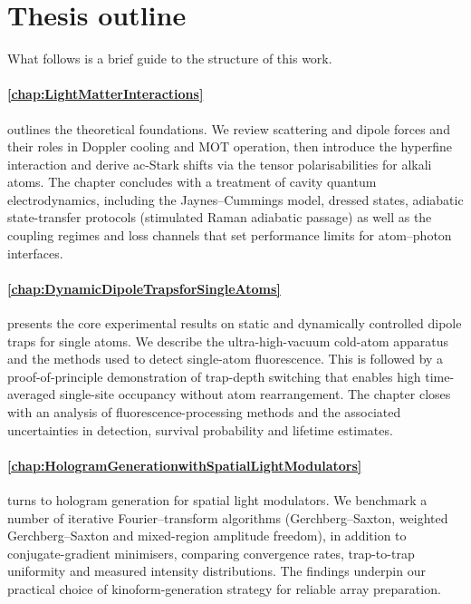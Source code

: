 \documentclass[../Thesis-IJspeert.tex]{subfiles}
\begin{document}
\section{Thesis outline}
\label{sec:intro-outline}
What follows is a brief guide to the structure of this work.

\paragraph{\autoref{chap:LightMatterInteractions}} outlines the theoretical foundations. We review scattering and dipole forces and their roles in Doppler cooling and MOT operation, then introduce the hyperfine interaction and derive ac-Stark shifts via the tensor polarisabilities for alkali atoms. The chapter concludes with a treatment of cavity quantum electrodynamics, including the Jaynes--Cummings model, dressed states, adiabatic state-transfer protocols (stimulated Raman adiabatic passage) as well as the coupling regimes and loss channels that set performance limits for atom–photon interfaces.

\paragraph{\autoref{chap:DynamicDipoleTrapsforSingleAtoms}} presents the core experimental results on static and dynamically controlled dipole traps for single  atoms. We describe the ultra-high-vacuum cold-atom apparatus and the methods used to detect single-atom fluorescence. This is followed by a proof-of-principle demonstration of trap-depth switching that enables high time-averaged single-site occupancy without atom rearrangement. The chapter closes with an analysis of fluorescence-processing methods and the associated uncertainties in detection, survival probability and lifetime estimates.

\paragraph{\autoref{chap:HologramGenerationwithSpatialLightModulators}} turns to hologram generation for spatial light modulators. We benchmark a number of iterative Fourier–transform algorithms (Gerchberg--Saxton, weighted Gerchberg--Saxton and mixed-region amplitude freedom), in addition to conjugate-gradient minimisers, comparing convergence rates, trap-to-trap uniformity and measured intensity distributions. The findings underpin our practical choice of kinoform-generation strategy for reliable array preparation.
\end{document}
